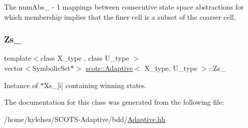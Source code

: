 The num\+Abs\+\_\+ -\/ 1 mappings between consecutive state space abstractions for which membership implies that the finer cell is a subset of the coarser cell. \mbox{\label{classscots_1_1Adaptive_a387e00a300c8c75d3a4eb6181dfab9c4}} 
\subsubsection{\texorpdfstring{Zs\+\_\+}{Zs\_}}
{\footnotesize\ttfamily template$<$class X\+\_\+type , class U\+\_\+type $>$ \\
vector$<$Symbolic\+Set$\ast$$>$ \hyperlink{classscots_1_1Adaptive}{scots\+::\+Adaptive}$<$ X\+\_\+type, U\+\_\+type $>$\+::Zs\+\_\+}

Instance of $\ast$\+Xs\+\_\+\mbox{[}i\mbox{]} containing winning states. 

The documentation for this class was generated from the following file\+:\begin{DoxyCompactItemize}
\item 
/home/kylehsu/\+S\+C\+O\+T\+S-\/\+Adaptive/bdd/\hyperlink{Adaptive_8hh}{Adaptive.\+hh}\end{DoxyCompactItemize}

